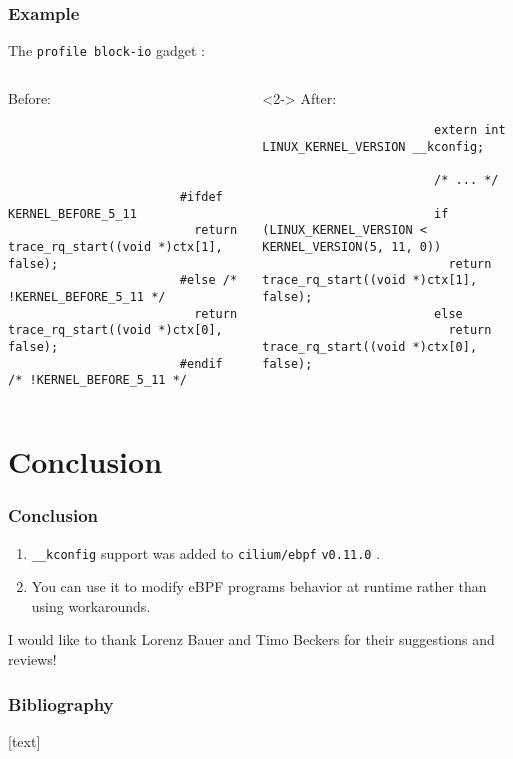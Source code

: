 \documentclass[table, trans, aspectratio = 169]{beamer}
\begin{document}
	\begin{frame}[fragile, t]
		\frametitle{Example}

		The \texttt{profile block-io} gadget \cite{laniel_pkggadgets_2022, laniel_pkggadgets_2023}:

		\bigskip

		\begin{columns}[T]
			\begin{column}{.5\textwidth}
				Before:

				{\scriptsize
					\begin{verbatim}




						#ifdef KERNEL_BEFORE_5_11
						  return trace_rq_start((void *)ctx[1], false);
						#else /* !KERNEL_BEFORE_5_11 */
						  return trace_rq_start((void *)ctx[0], false);
						#endif /* !KERNEL_BEFORE_5_11 */
					\end{verbatim}
				}
			\end{column}
			\begin{column}{.5\textwidth}<2->
				After:

				{\scriptsize
					\begin{verbatim}
						extern int LINUX_KERNEL_VERSION __kconfig;

						/* ... */

						if (LINUX_KERNEL_VERSION < KERNEL_VERSION(5, 11, 0))
						  return trace_rq_start((void *)ctx[1], false);
						else
						  return trace_rq_start((void *)ctx[0], false);
					\end{verbatim}
				}
			\end{column}
		\end{columns}

	\end{frame}

	\section{Conclusion}
	\begin{frame}
		\frametitle{Conclusion}
		\begin{enumerate}
			\item \texttt{\_\_kconfig} support was added to \texttt{cilium/ebpf} \texttt{v0.11.0} \cite{cilium_contributors_ciliumebpf_nodate-1}.
			\item You can use it to modify eBPF programs behavior at runtime rather than using workarounds.
		\end{enumerate}

		\bigskip

		\textcolor{structure}{I would like to thank Lorenz Bauer and Timo Beckers for their suggestions and reviews!}
	\end{frame}

	\begin{frame}
		\frametitle{Bibliography}

		\begin{scriptsize}
			
			
		\end{scriptsize}
	\end{frame}
\end{document}
